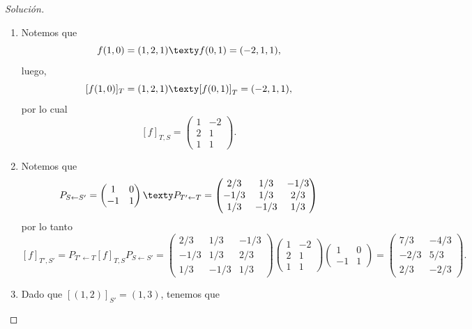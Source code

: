 \documentclass[a4,11pt]{aleph-notas}
\begin{document}
\begin{proof}[Solución]\hspace{0pt}
    \begin{enumerate}
    \item Notemos que 
    \[
        f(1, 0) = (1, 2, 1)
        \texty
        f(0, 1) = (-2, 1, 1),
    \]
    luego, 
    \[
        [f(1, 0)]_{T} = (1, 2, 1)
        \texty
        [f(0, 1)]_{T} = (-2, 1, 1),
    \]
    por lo cual
    \[
        [f]_{T,S} = 
        \begin{pmatrix}
            1 & -2\\
            2 & 1\\
            1 & 1
        \end{pmatrix}.
    \]
    \item Notemos que 
    \[
        P_{S \leftarrow S'} = 
        \begin{pmatrix}
            1 & 0\\
            -1 & 1
        \end{pmatrix}
        \texty
        P_{T' \leftarrow T} = 
        \begin{pmatrix}
            2/3 & 1/3 & -1/3\\
            -1/3 & 1/3 & 2/3\\
            1/3 & -1/3 & 1/3
        \end{pmatrix}
    \]
    por lo tanto
    \[
        [f]_{T',S'} = P_{T'\leftarrow T} [f]_{T,S} P_{S\leftarrow S'} = \begin{pmatrix}
            2/3 & 1/3 & -1/3\\
            -1/3 & 1/3 & 2/3\\
            1/3 & -1/3 & 1/3
        \end{pmatrix}
        \begin{pmatrix}
            1 & -2\\
            2 & 1\\
            1 & 1
        \end{pmatrix}
        \begin{pmatrix}
            1 & 0\\
            -1 & 1
        \end{pmatrix}
        = 
        \begin{pmatrix}
            7/3 & -4/3\\
            -2/3 & 5/3\\
            2/3 & -2/3
        \end{pmatrix}.
    \]
    \item Dado que $[(1, 2)]_{S'} = (1, 3)$, tenemos que

\end{enumerate}
\end{proof}
\end{document}
